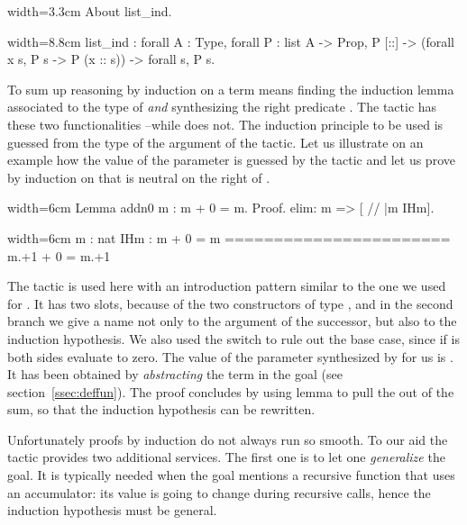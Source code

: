 \begin{coq}{}{width=3.3cm}
About list_ind.
\end{coq}
\begin{coqout}{}{width=8.8cm}
list_ind : forall A : Type, forall P : list A -> Prop,
  P [::] -> (forall x s, P s -> P (x :: s)) -> forall s, P s.
\end{coqout}

To sum up reasoning by induction on a term  means
finding the induction lemma associated to the type of 
\emph{and} synthesizing
the right predicate .  The  tactic has these two
functionalities --while  does not. The induction principle
to be used is guessed from the type of the argument of the tactic. Let
us illustrate on an example how the value of the parameter  is
guessed by the  tactic and let us prove by induction on 
that  is neutral on the right of .

\begin{coq}{}{width=6cm}
Lemma addn0 m : m + 0 = m.
Proof.
elim: m => [ // |m IHm].
\end{coq}
\begin{coqout}{}{width=6cm}
m : nat
IHm : m + 0 = m
=======================
m.+1 + 0 = m.+1
\end{coqout}
The  tactic is used here with an introduction pattern similar
to the one we used for . It has two slots, because of the
two constructors of type , and in the second branch we give a
name not only to the argument  of the successor, but also to the
induction hypothesis. We also used the \C{//} switch to rule out the
base case, since if
 is  both sides evaluate to zero. The value of the parameter
 synthesized by  for us is
. It has been obtained by
\emph{abstracting} the term  in the goal (see
section~\ref{ssec:deffun}). The proof concludes by using lemma 
to  pull the  out of the sum, so that the induction hypothesis
 can be rewritten.

Unfortunately proofs by induction do not always run so smooth.
To our aid the  tactic provides two additional services.
The first one is to let one \emph{generalize}
the goal.  It is typically needed when the goal mentions a recursive function
that uses an accumulator: its value is going to change during recursive calls,
hence the induction hypothesis must be general.

